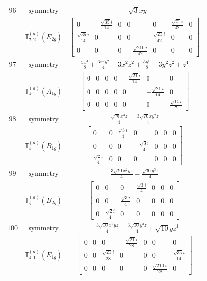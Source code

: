 \documentclass[fleqn,8pt,landscape]{jsarticle}
\begin{document}
\begin{longtable}{ccc}
$ 96 $ & $ \text{symmetry} $ & $ - \sqrt{3} x y $ \\
$  $ & $ \mathbb{T}_{2,2}^{(a)}(E_{2g}) $ & $ \begin{bmatrix} 0 & - \frac{\sqrt{35} i}{14} & 0 & 0 & 0 & \frac{\sqrt{21} i}{42} & 0 \\ \frac{\sqrt{35} i}{14} & 0 & 0 & 0 & \frac{\sqrt{21} i}{42} & 0 & 0 \\ 0 & 0 & 0 & - \frac{\sqrt{210} i}{42} & 0 & 0 & 0 \end{bmatrix} $ \\ \hline
$ 97 $ & $ \text{symmetry} $ & $ \frac{3 x^{4}}{8} + \frac{3 x^{2} y^{2}}{4} - 3 x^{2} z^{2} + \frac{3 y^{4}}{8} - 3 y^{2} z^{2} + z^{4} $ \\
$  $ & $ \mathbb{T}_{4}^{(a)}(A_{1g}) $ & $ \begin{bmatrix} 0 & 0 & 0 & 0 & - \frac{\sqrt{21} i}{14} & 0 & 0 \\ 0 & 0 & 0 & 0 & 0 & - \frac{\sqrt{21} i}{14} & 0 \\ 0 & 0 & 0 & 0 & 0 & 0 & \frac{\sqrt{14} i}{7} \end{bmatrix} $ \\ \hline
$ 98 $ & $ \text{symmetry} $ & $ \frac{\sqrt{70} x^{3} z}{4} - \frac{3 \sqrt{70} x y^{2} z}{4} $ \\
$  $ & $ \mathbb{T}_{4}^{(a)}(B_{1g}) $ & $ \begin{bmatrix} 0 & 0 & \frac{\sqrt{3} i}{4} & 0 & 0 & 0 & 0 \\ 0 & 0 & 0 & - \frac{\sqrt{3} i}{4} & 0 & 0 & 0 \\ \frac{\sqrt{2} i}{4} & 0 & 0 & 0 & 0 & 0 & 0 \end{bmatrix} $ \\ \hline
$ 99 $ & $ \text{symmetry} $ & $ \frac{3 \sqrt{70} x^{2} y z}{4} - \frac{\sqrt{70} y^{3} z}{4} $ \\
$  $ & $ \mathbb{T}_{4}^{(a)}(B_{2g}) $ & $ \begin{bmatrix} 0 & 0 & 0 & \frac{\sqrt{3} i}{4} & 0 & 0 & 0 \\ 0 & 0 & \frac{\sqrt{3} i}{4} & 0 & 0 & 0 & 0 \\ 0 & \frac{\sqrt{2} i}{4} & 0 & 0 & 0 & 0 & 0 \end{bmatrix} $ \\ \hline
$ 100 $ & $ \text{symmetry} $ & $ - \frac{3 \sqrt{10} x^{2} y z}{4} - \frac{3 \sqrt{10} y^{3} z}{4} + \sqrt{10} y z^{3} $ \\
$  $ & $ \mathbb{T}_{4,1}^{(a)}(E_{1g}) $ & $ \begin{bmatrix} 0 & 0 & 0 & - \frac{\sqrt{21} i}{28} & 0 & 0 & 0 \\ 0 & 0 & \frac{\sqrt{21} i}{28} & 0 & 0 & 0 & \frac{\sqrt{35} i}{14} \\ 0 & 0 & 0 & 0 & 0 & \frac{\sqrt{210} i}{28} & 0 \end{bmatrix} $ \\ \hline

\end{longtable}
\end{document}
